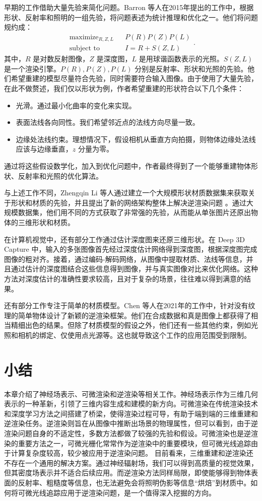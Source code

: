 早期的工作借助大量先验来简化问题。Barron 等人在2015年提出的工作中\cite{SIRS}，根据形状、反射率和照明的一组先验，将问题表述为统计推理和优化之一。他们将问题规约成：
\begin{equation*}
  \begin{array}{ccc}\text{maximize}_{R,Z,L}&&P(R)P(Z)P(L)\\\text{subject to}&&I=R+S(Z,L)\end{array}.
\end{equation*}
其中，$R$ 是对数反射图像，$Z$ 是深度图，$L$ 是用球谐函数表示的光照。$S(Z,L)$是一个渲染引擎。$P(R), P(Z), P(L)$ 分别是反射率、形状和光照的先验。他们希望重建的模型尽量符合先验，同时需要符合输入图像。由于使用了大量先验，在此不做赘述，我们仅以形状为例，作者希望重建的形状符合以下几个条件：
\begin{itemize}
  \item 光滑。通过最小化曲率的变化来实现。
  \item 表面法线各向同性。我们希望邻近点的法线方向尽量一致。
  \item 边缘处法线约束。理想情况下，假设相机从垂直方向拍摄，则物体边缘处法线应该与边缘垂直，$z$ 分量为零。
\end{itemize}
通过将这些假设数学化，加入到优化问题中，作者最终得到了一个能够重建物体形状、反射率和光照的优化算法。

与上述工作不同，Zhengqin Li 等人通过建立一个大规模形状材质数据集来获取关于形状和材质的先验，并且提出了新的网络架构整体上解决逆渲染问题 \cite{Learning1image}。通过大规模数据集，他们用不同的方式获取了非常强的先验，从而能从单张图片还原出物体的三维形状和材质。

在计算机视觉中，还有部分工作通过估计深度图来还原三维形状。在 Deep 3D Capture \cite{D3DC} 中，输入的多张图像首先经过深度估计网络得到深度图，根据深度图完成图像的粗对齐。接着，通过编码-解码网络，从图像中提取材质、法线等信息，并且通过估计的深度图结合这些信息得到图像，并与真实图像对比来优化网络。这种方法对深度估计的准确性要求较高，且对于复杂的场景，往往难以得到满意的结果。

还有部分工作专注于简单的材质模型。Chen 等人在2021年的工作中，针对没有纹理的简单物体设计了新颖的逆渲染框架。他们在合成数据和真是图像上都获得了相当精细出色的结果。但除了材质模型的假设之外，他们还有一些其他约束，例如光照和相机的绑定、仅使用点光源等。这也就导致这个工作的应用范围受到限制。

\section{小结}

本章介绍了神经场表示、可微渲染和逆渲染等相关工作。神经场表示作为三维几何表示的一种革新，引领了三维内容生成和建模的新方向。可微渲染在传统渲染技术和深度学习方法之间搭建了桥梁，使得渲染过程可导，有助于端到端的三维重建和逆渲染任务。逆渲染则旨在从图像中推断出场景的物理属性，但可以看到，由于逆渲染问题自身的不适定性，多数方法都做了较强的先验和假设。可微渲染也是逆渲染的重要方法之一，可微光栅化常常作为逆渲染中的重要模块，但可微光线追踪由于计算复杂度较高，较少被应用于逆渲染问题。
目前看来，三维重建和逆渲染还不存在一个通用的解决方案。通过神经辐射场，我们可以得到高质量的视觉效果，但其密度场表示并不适合后续应用。而逆渲染方法同样局限，即使能够得到物体表面的反射率、粗糙度等信息，也无法避免会将照明伪影等信息“烘焙”到材质中。如何将可微光线追踪应用于逆渲染问题，是一个值得深入挖掘的方向。
